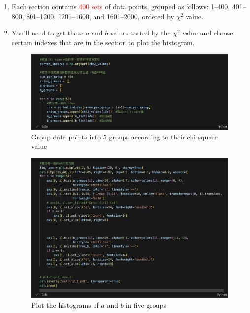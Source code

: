 \documentclass[12pt,a4paper]{article}
\begin{document}
\begin{CJK}{UTF8}{bkai}
\begin{enumerate}
    \item Each section contains \textcolor{red}{400 sets} of data points, grouped as follows: 1--400, 401--800, 801--1200, 1201--1600, and 1601--2000, ordered by $\chi^2$ value.
    
    \item You'll need to get those $a$ and $b$ values sorted by the $\chi^2$ value and choose certain indexes that are in the section to plot the histogram.
    \begin{figure}[h]
      \centering
      \includegraphics[width=1\linewidth]{figures/code/practice_2/code_2_1.png}
      \caption{Group data points into 5 groups according to their chi-square value}
      \label{fig:code_2_1}
    \end{figure}
    \begin{figure}[h]
      \centering
      \includegraphics[width=1\linewidth]{figures/code/practice_2/code_2_2.png}
      \caption{Plot the histograms of $a$ and $b$ in five groups}
      \label{fig:code_2_2}
    \end{figure}
  
\end{enumerate}



\end{CJK}
\end{document}
